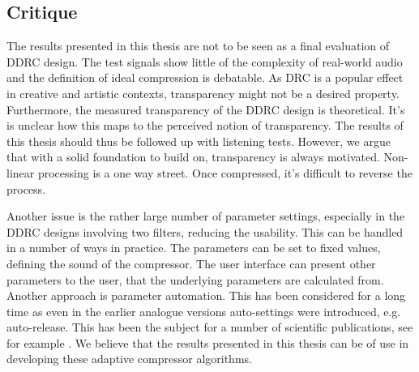 \documentclass[../main2.tex]{subfiles}
\begin{document}
\subsection{Critique}\label{discussion_results}
The results presented in this thesis are not to be seen as a final evaluation of DDRC design. The test signals show little of the complexity of real-world audio and the definition of ideal compression is debatable. As DRC is a popular effect in creative and artistic contexts, transparency might not be a desired property. Furthermore, the measured transparency of the DDRC design is theoretical. It's is unclear how this maps to the perceived notion of transparency. The results of this thesis should thus be followed up with listening tests. However, we argue that with a solid foundation to build on, transparency is always motivated. Non-linear processing is a one way street. Once compressed, it's difficult to reverse the process. 

Another issue is the rather large number of parameter settings, especially in the DDRC designs involving two filters, reducing the usability. This can be handled in a number of ways in practice. The parameters can be set to fixed values, defining the sound of the compressor. The user interface can present other parameters to the user, that the underlying parameters are calculated from. Another approach is parameter automation. This has been considered for a long time as even in the earlier analogue versions auto-settings were introduced, e.g. auto-release. This has been the subject for a number of scientific publications, see for example . We believe that the results presented in this thesis can be of use in developing these adaptive compressor algorithms.
\end{document}
